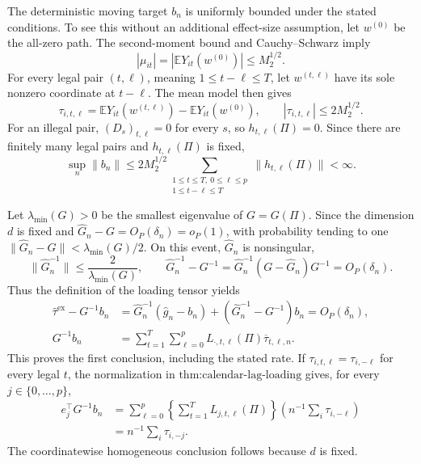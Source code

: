The deterministic moving target \(b_n\) is uniformly bounded under the stated conditions. To see this without an additional effect-size assumption, let \(w^{(0)}\) be the all-zero path. The second-moment bound and Cauchy--Schwarz imply
\[
|\mu_{it}|=|\mathbb E Y_{it}(w^{(0)})|\leq M_2^{1/2}.
\]
For every legal pair \((t,\ell)\), meaning \(1\leq t-\ell\leq T\), let \(w^{(t,\ell)}\) have its sole nonzero coordinate at \(t-\ell\). The mean model then gives
\[
\tau_{i,t,\ell}
=\mathbb E Y_{it}(w^{(t,\ell)})-\mathbb E Y_{it}(w^{(0)}),
\qquad
|\tau_{i,t,\ell}|\leq 2M_2^{1/2}.
\]
For an illegal pair, \((D_s)_{t,\ell}=0\) for every \(s\), so \(h_{t,\ell}(\Pi)=0\). Since there are finitely many legal pairs and \(h_{t,\ell}(\Pi)\) is fixed,
\[
\sup_n\|b_n\|
\leq 2M_2^{1/2}\sum_{\substack{1\leq t\leq T,\ 0\leq\ell\leq p\\1\leq t-\ell\leq T}}
\|h_{t,\ell}(\Pi)\|<\infty.
\]

Let \(\lambda_{\min}(G)>0\) be the smallest eigenvalue of \(G=G(\Pi)\). Since the dimension \(d\) is fixed and \(\widehat G_n-G=O_P(\delta_n)=o_P(1)\), with probability tending to one
\(\|\widehat G_n-G\|<\lambda_{\min}(G)/2\). On this event, \(\widehat G_n\) is nonsingular,
\[
\|\widehat G_n^{-1}\|\leq \frac{2}{\lambda_{\min}(G)},
\qquad
\widehat G_n^{-1}-G^{-1}
=\widehat G_n^{-1}(G-\widehat G_n)G^{-1}
=O_P(\delta_n).
\]
Thus the definition of the loading tensor yields
\[
\begin{aligned}
\widehat\tau^{\mathrm{ex}}-G^{-1}b_n
&=\widehat G_n^{-1}(\widehat g_n-b_n)
  +(\widehat G_n^{-1}-G^{-1})b_n
=O_P(\delta_n),\\
G^{-1}b_n
&=\sum_{t=1}^{T}\sum_{\ell=0}^{p}
L_{\cdot,t,\ell}(\Pi)\overline\tau_{t,\ell,n}.
\end{aligned}
\]
This proves the first conclusion, including the stated rate. If
\(\tau_{i,t,\ell}=\tau_{i,-\ell}\) for every legal \(t\), the normalization in \(\text{thm:calendar-lag-loading}\) gives, for every \(j\in\{0,\ldots,p\}\),
\[
\begin{aligned}
e_j^{\top}G^{-1}b_n
&=\sum_{\ell=0}^{p}\left\{\sum_{t=1}^{T}L_{j,t,\ell}(\Pi)\right\}
  \left(n^{-1}\sum_i\tau_{i,-\ell}\right)\\
&=n^{-1}\sum_i\tau_{i,-j}.
\end{aligned}
\]
The coordinatewise homogeneous conclusion follows because \(d\) is fixed.

